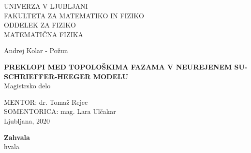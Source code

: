 \pagestyle{empty}
\begin{center}

{\large UNIVERZA V LJUBLJANI\\
FAKULTETA ZA MATEMATIKO IN FIZIKO\\
ODDELEK ZA FIZIKO\\
MATEMATIČNA FIZIKA\\}


\vspace{4cm}


{\Large Andrej Kolar - Požun\\}

\vspace{10mm}

{\bf \Large PREKLOPI MED TOPOLOŠKIMA FAZAMA V NEUREJENEM SU-SCHRIEFFER-HEEGER MODELU}\\
\vspace{5mm}
{\large Magistrsko delo}\\




\vfill



{\large MENTOR: dr. Tomaž Rejec\\
SOMENTORICA: mag. Lara Ulčakar\\


\vspace{2cm}
Ljubljana, 2020}

\end{center}


\cleardoublepage
\mbox{}
\vfill
{\Large \bf Zahvala}
\vspace{1cm}\\
hvala


